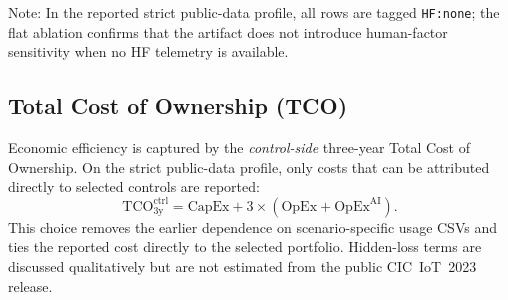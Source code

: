 \documentclass[preprint,12pt]{elsarticle}
\begin{document}
\begin{flushleft}\footnotesize
Note: In the reported strict public-data profile, all rows are tagged \texttt{HF:none}; the flat ablation confirms that the artifact does not introduce human-factor sensitivity when no HF telemetry is available.
\end{flushleft}

\subsection{Total Cost of Ownership (TCO)}
\label{sec:tco}

Economic efficiency is captured by the \emph{control-side} three-year Total Cost of Ownership. On the strict public-data profile, only costs that can be attributed directly to selected controls are reported:
\[
  \mathrm{TCO}^{\mathrm{ctrl}}_{\mathrm{3y}}=\mathrm{CapEx}+3\times(\mathrm{OpEx}+\mathrm{OpEx}^{\mathrm{AI}}).
\]
This choice removes the earlier dependence on scenario-specific usage CSVs and ties the reported cost directly to the selected portfolio. Hidden-loss terms are discussed qualitatively but are not estimated from the public CIC~IoT~2023 release.
\end{document}
